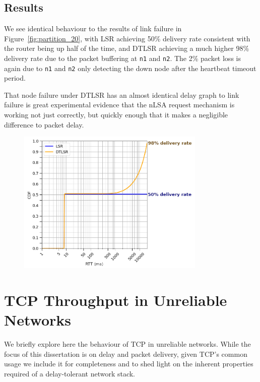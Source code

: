 \documentclass[withindex,glossary,openany]{cam-thesis}
\begin{document}
\subsection{Results}

We see identical behaviour to the results of link failure in Figure~\ref{fig:partition_20}, with LSR achieving 50\% delivery rate consistent with the router being up half of the time, and DTLSR achieving a much higher 98\% delivery rate due to the packet buffering at \texttt{n1} and \texttt{n2}. The 2\% packet loss is again due to \texttt{n1} and \texttt{n2} only detecting the down node after the heartbeat timeout period.

That node failure under DTLSR has an almost identical delay graph to link failure is great experimental evidence that the nLSA request mechanism is working not just correctly, but quickly enough that it makes a negligible difference to packet delay.

\begin{figure}[H] \centering
	\hspace*{2.4cm}
	\includegraphics[width=0.8\textwidth]{delay_node_flap20}
	\label{fig:delay_node_flap20}
\end{figure}




\section{TCP Throughput in Unreliable Networks}
\label{sec:tcp}

We briefly explore here the behaviour of TCP in unreliable networks. While the focus of this dissertation is on delay and packet delivery, given TCP's common usage we include it for completeness and to shed light on the inherent properties required of a delay-tolerant network stack.
\end{document}
